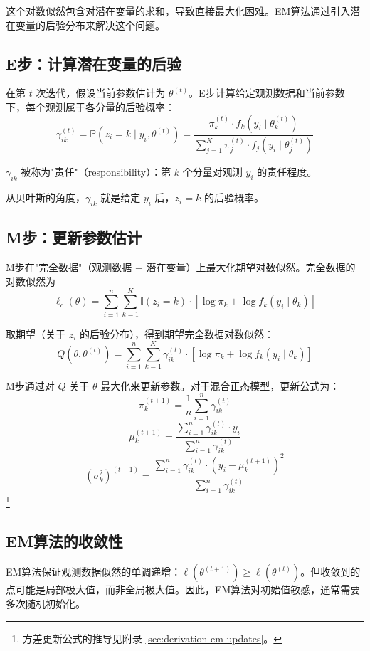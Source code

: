这个对数似然包含对潜在变量的求和，导致直接最大化困难。EM算法通过引入潜在变量的后验分布来解决这个问题。

\subsection{E步：计算潜在变量的后验}

在第 $t$ 次迭代，假设当前参数估计为 $\theta^{(t)}$。E步计算给定观测数据和当前参数下，每个观测属于各分量的后验概率：
\[
\gamma_{ik}^{(t)} = \mathbb{P}(z_i = k \mid y_i, \theta^{(t)}) = \frac{\pi_k^{(t)} \cdot f_k(y_i \mid \theta_k^{(t)})}{\sum_{j=1}^{K} \pi_j^{(t)} \cdot f_j(y_i \mid \theta_j^{(t)})}
\label{eq:mixture-responsibility}
\]

$\gamma_{ik}$ 被称为"责任"（responsibility）：第 $k$ 个分量对观测 $y_i$ 的责任程度。

从贝叶斯的角度，$\gamma_{ik}$ 就是给定 $y_i$ 后，$z_i = k$ 的后验概率。

\subsection{M步：更新参数估计}

M步在"完全数据"（观测数据 + 潜在变量）上最大化期望对数似然。完全数据的对数似然为
\[
\ell_c(\theta) = \sum_{i=1}^{n} \sum_{k=1}^{K} \mathbb{I}(z_i = k) \cdot \left[ \log \pi_k + \log f_k(y_i \mid \theta_k) \right]
\]

取期望（关于 $z_i$ 的后验分布），得到期望完全数据对数似然：
\[
Q(\theta, \theta^{(t)}) = \sum_{i=1}^{n} \sum_{k=1}^{K} \gamma_{ik}^{(t)} \cdot \left[ \log \pi_k + \log f_k(y_i \mid \theta_k) \right]
\]

M步通过对 $Q$ 关于 $\theta$ 最大化来更新参数。对于混合正态模型，更新公式为：
\[
\pi_k^{(t+1)} = \frac{1}{n} \sum_{i=1}^{n} \gamma_{ik}^{(t)}
\]
\[
\mu_k^{(t+1)} = \frac{\sum_{i=1}^{n} \gamma_{ik}^{(t)} \cdot y_i}{\sum_{i=1}^{n} \gamma_{ik}^{(t)}}
\]
\[
(\sigma_k^2)^{(t+1)} = \frac{\sum_{i=1}^{n} \gamma_{ik}^{(t)} \cdot (y_i - \mu_k^{(t+1)})^2}{\sum_{i=1}^{n} \gamma_{ik}^{(t)}}
\label{eq:mixture-variance-update}
\]\footnote{方差更新公式的推导见附录 \cref{sec:derivation-em-updates}。}

\subsection{EM算法的收敛性}

EM算法保证观测数据似然的单调递增：$\ell(\theta^{(t+1)}) \geq \ell(\theta^{(t)})$。但收敛到的点可能是局部极大值，而非全局极大值。因此，EM算法对初始值敏感，通常需要多次随机初始化。


